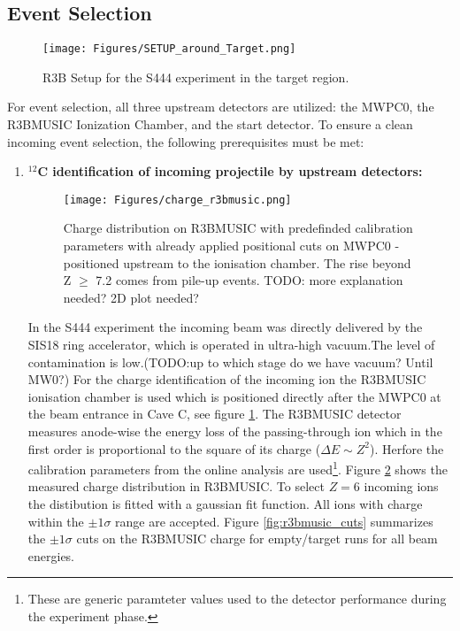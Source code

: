 \subsection{Event Selection}\label{subsec:event-sel}
\begin{figure}[htpb]
    \centering
    \texttt{[image: Figures/SETUP\_around\_Target.png]}
    \caption{
    R3B Setup for the S444 experiment in the target region. 
    }
    \label{fig:setup_target_region}
\end{figure}

For event selection, all three upstream detectors are utilized: the MWPC0, the R3BMUSIC Ionization Chamber, and the start detector. To ensure a clean incoming event selection, the following prerequisites must be met:
\begin{enumerate}
\item \textbf{$^{12}$C identification of incoming projectile by upstream detectors:}\newline
\begin{figure}[htpb]
    \centering
    \texttt{[image: Figures/charge\_r3bmusic.png]}
    \caption{
    Charge distribution on R3BMUSIC with predefinded calibration parameters with already applied positional cuts on MWPC0 - positioned upstream to the ionisation chamber. The rise beyond Z $\ge$ 7.2 comes from pile-up events. TODO: more explanation needed? 2D plot needed? 
    }
    \label{fig:r3bmusic_charge}
\end{figure}
In the S444 experiment the incoming beam was directly delivered by the SIS18 ring accelerator, which is operated in ultra-high vacuum.The level of contamination is low.(TODO:up to which stage do we have vacuum? Until MW0?)\newline %
For the charge identification of the incoming ion the R3BMUSIC ionisation chamber is used which is positioned directly after the MWPC0 at the beam entrance in Cave C, see figure \ref{fig:setup_target_region}. The R3BMUSIC detector measures anode-wise the energy loss of the passing-through ion which in the first order is proportional to the square of its charge ($\Delta E \sim Z^{2}$). Herfore the calibration parameters from the online analysis are used\footnote{These are generic paramteter values used to the detector performance during the experiment phase.}. Figure \ref{fig:r3bmusic_charge} shows the measured charge distribution in R3BMUSIC. To select $Z = 6$ incoming ions the distibution is fitted with a gaussian fit function. All ions with charge within the $\pm 1 \sigma$ range are accepted. Figure \ref{fig:r3bmusic_cuts} summarizes the $\pm 1 \sigma$ cuts on the R3BMUSIC charge for empty/target runs for all beam energies.   

\end{enumerate}
